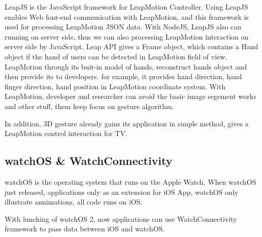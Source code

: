 LeapJS is the JavaScript framework for LeapMotion Controller.
Using LeapJS enables Web font-end communication with LeapMotion, and this framework is used for processing LeapMotion JSON data.
With NodeJS, LeapJS also can running on server side, thus we can also processing LeapMotion interaction on server side by JavaScript.
Leap API gives a Frame object, which contains a Hand object if the hand of users can be detected in LeapMotion field of view. LeapMotion through its buit-in model of hands, reconstruct hands object and then provide its to developers.
for example, it provides hand direction, hand finger direction, hand position in LeapMotion coordinate system.
With LeapMotion, developer and researcher can avoid the basic image segement works and other stuff, them keep focus on gesture algorithm\cite{garber2013gestural,xusuibin2015,panjiajia2015,huhong2015,marin2014hand}.

In addition, 3D gesture already gains its application in simple method, \cite{zaicti2015free} gives a LeapMotion control interaction for TV.

\subsection{watchOS \& WatchConnectivity}

watchOS is the operating system that runs on the Apple Watch. When watchOS just released, applications only as an extension for iOS App, watchOS only illustrate annimations, all code runs on iOS.

With lunching of watchOS 2, now applications can use WatchConnectivity framework to pass data between iOS and watchOS.

